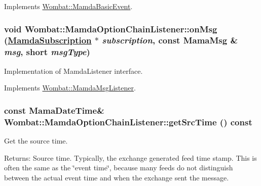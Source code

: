 Implements \hyperlink{classWombat_1_1MamdaBasicEvent_94e531c6ae9ae7798725db14facbd6e2}{Wombat::Mamda\-Basic\-Event}.\hypertarget{classWombat_1_1MamdaOptionChainListener_c708f2e0adbf7309762ea71632e80b71}{
\subsubsection[onMsg]{\setlength{\rightskip}{0pt plus 5cm}void Wombat::Mamda\-Option\-Chain\-Listener::on\-Msg (\hyperlink{classWombat_1_1MamdaSubscription}{Mamda\-Subscription} $\ast$ {\em subscription}, const Mama\-Msg \& {\em msg}, short {\em msg\-Type})}}
\label{classWombat_1_1MamdaOptionChainListener_c708f2e0adbf7309762ea71632e80b71}


Implementation of Mamda\-Listener interface. 



Implements \hyperlink{classWombat_1_1MamdaMsgListener_c700829ebcce095b95b8b67b39a1c67d}{Wombat::Mamda\-Msg\-Listener}.\hypertarget{classWombat_1_1MamdaOptionChainListener_7efc05e17f323d3b3fe4da601048886b}{
\subsubsection[getSrcTime]{\setlength{\rightskip}{0pt plus 5cm}const Mama\-Date\-Time\& Wombat::Mamda\-Option\-Chain\-Listener::get\-Src\-Time () const}}
\label{classWombat_1_1MamdaOptionChainListener_7efc05e17f323d3b3fe4da601048886b}


Get the source time. 

\begin{Desc}
\item[Returns:]Source time. Typically, the exchange generated feed time stamp. This is often the same as the \char`\"{}event time\char`\"{}, because many feeds do not distinguish between the actual event time and when the exchange sent the message. \end{Desc}


